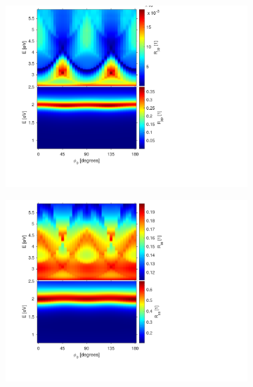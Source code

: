 \begin{figure}
    \begin{subfigure}{0.5\textwidth}
        \centering
        \includegraphics[width=\linewidth, trim=1.1cm 1.8cm 6.7cm 0.3cm, clip]{figures/ch4/S5A/contour/S5A_Rpp.pdf}
        \caption{}
        \label{fig:S5A_contour_Rpp}
    \end{subfigure}
    \begin{subfigure}{0.5\textwidth}
        \centering
        \includegraphics[width=\linewidth, trim=1.1cm 1.8cm 6.7cm 0.3cm, clip]{figures/ch4/S5A/contour/S5A_Rss.pdf}
        \caption{}
        \label{fig:S5A_contour_Rss}
    \end{subfigure}
    

\end{figure}
